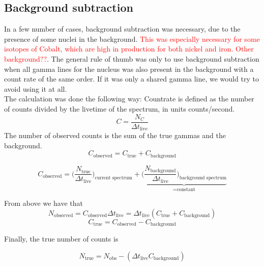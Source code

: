 \documentclass[a4paper,11pt,twoside]{book}
\begin{document}
\subsection{Background subtraction}

\noindent 
In a few number of cases, background subtraction was necessary, due to the presence of some nuclei in the background. \textcolor{red}{This was especially necessary for some isotopes of Cobalt, which are high in production for both nickel and iron. Other background??}. The general rule of thumb was only to use background subtraction when all gamma lines for the nucleus was also present in the background with a count rate of the same order. If it was only a shared gamma line, we would try to avoid using it at all. \\

\noindent 
The calculation was done the following way: 
Countrate is defined as the number of counts divided by the livetime of the spectrum, in units counts/second. 
$$C=\frac{N_C}{\Delta t_\text{live}}$$
The number of observed counts is the sum of the true gammas and the background. 
\begin{equation}
    C_\text{observed}=C_\text{true} + C_\text{background}
\end{equation}

\begin{equation}
 C_\text{observed}= \Big(\frac{N_\text{true} }{\Delta t_\text{live}} \Big)_\text{current spectrum}  + \underbrace{\Big( \frac{N_\text{background}}{\Delta t_\text{live}} \Big)_\text{background spectrum}}_\text{=constant}
 \end{equation} %




From above we have that 
\begin{equation}
    N_\text{observed}=C_\text{observed}\Delta t_\text{live} = \Delta t_\text{live}(C_\text{true}+C_\text{background})
\end{equation}
\begin{equation}
    C_\text{true} = C_\text{observed}-C_\text{background}
\end{equation}

Finally, the true number of counts is

\begin{equation}
    N_\text{true}=N_\text{obs}- (\Delta t_\text{live} C_\text{background})
\end{equation}
\end{document}
